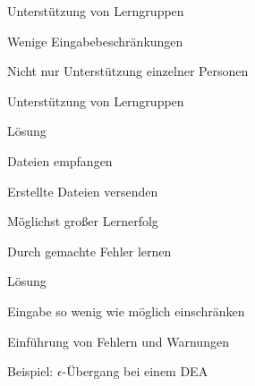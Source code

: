 



{
    \begin{itemgroup}{}
	\item Unterstützung von Lerngruppen
	\item Wenige Eingabebeschränkungen
	\end{itemgroup}

    \vfill{}
}


{
    \begin{itemgroup}{}
	\item Nicht nur Unterstützung einzelner Personen
	\item Unterstützung von Lerngruppen
    \end{itemgroup}

    \begin{itemgroup}{Lösung}
	\item Dateien empfangen
	\item Erstellte Dateien versenden
	\end{itemgroup}
    
    \vfill{}
}


{
    \begin{itemgroup}{}
	\item Möglichst großer Lernerfolg
	\item Durch gemachte Fehler lernen
    \end{itemgroup}

    \begin{itemgroup}{Lösung}
	\item Eingabe so wenig wie möglich einschränken
	\item Einführung von Fehlern und Warnungen
	\item Beispiel: $\epsilon$-Übergang bei einem DEA
	\end{itemgroup}
    
    \vfill{}
}


